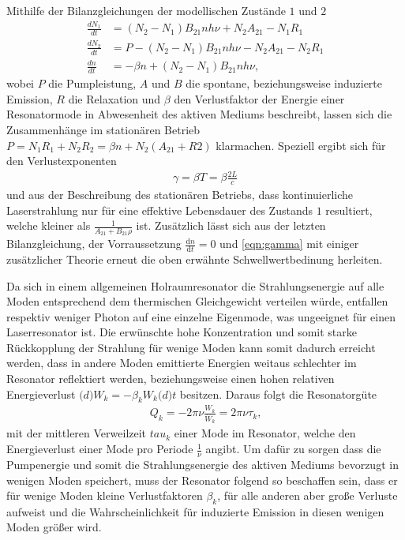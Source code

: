 Mithilfe der Bilanzgleichungen der modellischen Zustände $1$ und $2$
\begin{align*}
    \frac{dN_1}{dt} &= (N_2 - N_1) B_{21} n h \nu + N_2 A_{21} - N_1 R_1 \\
    \frac{dN_2}{dt} &= P - (N_2 - N_1) B_{21} n h \nu - N_2 A_{21} - N_2 R_1 \\
    \frac{dn}{dt}   &= -\beta n + (N_2 - N_1) B_{21} n h \nu\text{,}
\end{align*}
wobei $P$ die Pumpleistung, $A$ und $B$ die spontane, beziehungsweise induzierte Emission, $R$ die Relaxation und $\beta$ den Verlustfaktor der Energie einer Resonatormode in Abwesenheit des aktiven Mediums beschreibt, lassen sich die Zusammenhänge im stationären Betrieb $P=N_1R_1+N_2R_2=\beta n + N_2(A_{21}+R2)$ klarmachen.
Speziell ergibt sich für den Verlustexponenten
\begin{align}
    \gamma = \beta T = \beta \frac{2L}{c}\label{eqn:gamma}
\end{align}
und aus der Beschreibung des stationären Betriebs, dass kontinuierliche Laserstrahlung nur für eine effektive Lebensdauer des Zustands $1$ resultiert, welche kleiner als $\frac{1}{A_{21}+B_{21}\rho}$ ist.
Zusätzlich lässt sich aus der letzten Bilanzgleichung, der Vorraussetzung $\frac{\mathrm{d} n}{\mathrm{d} t}=0$ und \autoref{eqn:gamma} mit einiger zusätzlicher Theorie erneut die oben erwähnte Schwellwertbedinung herleiten.

Da sich in einem allgemeinen Holraumresonator die Strahlungsenergie auf alle Moden entsprechend dem thermischen Gleichgewicht verteilen würde, entfallen respektiv weniger Photon auf eine einzelne Eigenmode, was ungeeignet für einen Laserresonator ist.
Die erwünschte hohe Konzentration und somit starke Rückkopplung der Strahlung für wenige Moden kann somit dadurch erreicht werden, dass in andere Moden emittierte Energien weitaus schlechter im Resonator reflektiert werden, beziehungsweise einen hohen relativen Energieverlust $\mathrm(d)W_k=-\beta_kW_k\mathrm(d)t$ besitzen.
Daraus folgt die Resonatorgüte
\begin{align}
    Q_k=-2\pi\nu \frac{W_k}{\dot{W}_k}=2\pi\nu\tau_k\text{,}
\end{align}
mit der mittleren Verweilzeit $tau_k$ einer Mode im Resonator, welche den Energieverlust einer Mode pro Periode $\frac{1}{\nu}$ angibt.
Um dafür zu sorgen dass die Pumpenergie und somit die Strahlungsenergie des aktiven Mediums bevorzugt in wenigen Moden speichert, muss der Resonator folgend so beschaffen sein, dass er für wenige Moden kleine Verlustfaktoren $\beta_k$, für alle anderen aber große Verluste aufweist und die Wahrscheinlichkeit für induzierte Emission in diesen wenigen Moden größer wird.

